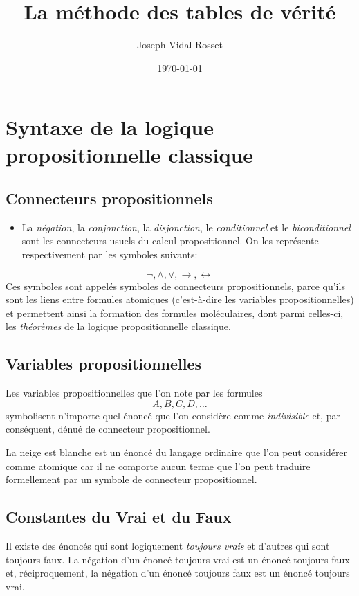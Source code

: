 \documentclass[article,reqno,times,12pt,french]{smfart}
\author{Joseph Vidal-Rosset}
\date{\today}
\title{La méthode des tables de vérité}
\begin{document}
\maketitle
\tableofcontents


\section{Syntaxe de la logique propositionnelle classique}
\label{sec:org2c4fe97}
\subsection{Connecteurs propositionnels}
\label{sec:org765e617}
\begin{itemize}
\item La \emph{négation},  la \emph{conjonction},  la \emph{disjonction},  le \emph{conditionnel}  et le
\emph{biconditionnel} sont les connecteurs usuels  du calcul propositionnel. On les
représente respectivement par les symboles suivants:
\end{itemize}
\[
\lnot, \land, \lor, \to, \leftrightarrow
\]
Ces symboles  sont appelés \og symboles de  connecteurs propositionnels\fg{},
parce qu'ils  sont les liens entre  formules \og atomiques\fg{} (c'est-à-dire
les variables propositionnelles) et  permettent ainsi la formation des
formules \og moléculaires\fg{},  dont parmi celles-ci, les  \emph{théorèmes} de la
logique propositionnelle classique. 
\subsection{Variables propositionnelles}
\label{sec:orge4e8216}
Les variables propositionnelles  que l'on note par les formules
      \[
       A, B, C, D, \dots
      \]
symbolisent   n'importe  quel   énoncé   que   l'on  considère   comme
\emph{indivisible} et, par conséquent, dénué de connecteur propositionnel.   
\begin{exem}
\og La neige  est blanche\fg{} est  un énoncé  du langage ordinaire  que l'on
peut considérer comme atomique car il ne comporte aucun terme que l'on
peut   traduire   formellement   par    un   symbole   de   connecteur
propositionnel. 
\end{exem}
\subsection{Constantes du Vrai et du Faux}
\label{sec:orgbaa765a}
Il  existe  des  énoncés  qui sont  logiquement  \emph{toujours  vrais}  et
d'autres qui  sont toujours  faux.  La  négation d'un  énoncé toujours
vrai est un énoncé toujours  faux et, réciproquement, la négation d'un
énoncé toujours faux est un énoncé toujours vrai.
\end{document}
